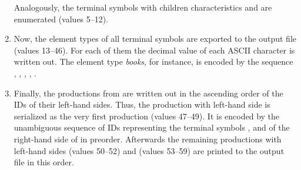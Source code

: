 \documentclass[12pt]{llncs}
\begin{document}
\begin{example}
\begin{enumerate}[(1)]
		Analogously, the terminal symbols with children characteristics  and  are enumerated (values 5--12).
	\item Now, the element types of all terminal symbols are exported to the output file (values 13--46). For each of them the decimal value of each ASCII character is written out. The element type \emph{books}, for instance, is encoded by the sequence , , , , . 
	\item Finally, the productions from  are written out in the ascending order of the IDs of their left-hand sides. Thus, the production with left-hand side  is serialized as the very first production (values 47--49). It is encoded by the unambiguous sequence of IDs  representing the terminal symbols ,  and  of the right-hand side of  in preorder.
		Afterwards the remaining productions with left-hand sides  (values 50--52) and  (values 53--59) are printed to the output file in this order. 
\end{enumerate}
\end{example}
\end{document}
